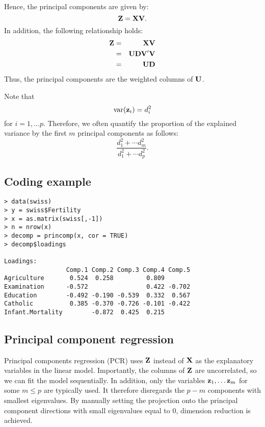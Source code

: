 Hence, the principal components are given by:
$$
\mathbf{Z} = \mathbf{X} \mathbf{V}.
$$
In addition, the following relationship holds:
\begin{eqnarray*}
\mathbf{Z} &=& \mathbf{X} \mathbf{V}\\
&=& \mathbf{U} \mathbf{D} \mathbf{V}' \mathbf{V}\\
&=& \mathbf{U} \mathbf{D}
\end{eqnarray*}
Thus, the principal components are the weighted columns of $\mathbf{U}$.

Note that 
$$\mathrm{var}(\mathbf{z}_i) = d_i^2$$ 
for $i=1, \ldots p$.
Therefore, we often quantify the proportion of the explained variance by the first $m$ principal components as follows:
$$
\frac{d_1^2 + \cdots d_m^2}{d_1^2 + \cdots d_p^2}.
$$


\subsection{Coding example}


\begin{verbatim}
> data(swiss)
> y = swiss$Fertility
> x = as.matrix(swiss[,-1])
> n = nrow(x)
> decomp = princomp(x, cor = TRUE)
> decomp$loadings

Loadings:
                 Comp.1 Comp.2 Comp.3 Comp.4 Comp.5
Agriculture       0.524  0.258         0.809       
Examination      -0.572                0.422 -0.702
Education        -0.492 -0.190 -0.539  0.332  0.567
Catholic          0.385 -0.370 -0.726 -0.101 -0.422
Infant.Mortality        -0.872  0.425  0.215       

\end{verbatim}


\subsection{Principal component regression}

Principal components regression (PCR) uses $\mathbf{Z}$ instead of $\mathbf{X}$ as the explanatory variables in the linear model.
Importantly, the columns of $\mathbf{Z}$ are uncorrelated, so we can fit the model sequentially.
In addition, only the variables $\mathbf{z}_1, \ldots \mathbf{z}_m$ for some $m \le p$ are typically used.
It therefore disregards the $p-m$ components with smallest eigenvalues.
By manually setting the projection onto the principal component directions with small eigenvalues equal to $0$, dimension reduction is achieved. 

